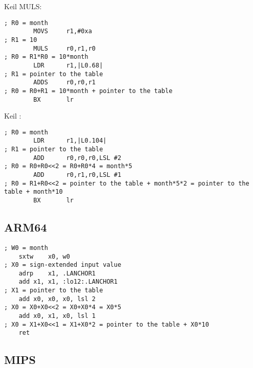 \Optimizing Keil 
 MULS:

\begin{lstlisting}[caption=\OptimizingKeilVI (\ThumbMode)]
; R0 = month
        MOVS     r1,#0xa
; R1 = 10
        MULS     r0,r1,r0
; R0 = R1*R0 = 10*month
        LDR      r1,|L0.68|
; R1 = pointer to the table
        ADDS     r0,r0,r1
; R0 = R0+R1 = 10*month + pointer to the table
        BX       lr
\end{lstlisting}

\Optimizing Keil :

\begin{lstlisting}[caption=\OptimizingKeilVI (\ARMMode)]
; R0 = month
        LDR      r1,|L0.104|
; R1 = pointer to the table
        ADD      r0,r0,r0,LSL #2
; R0 = R0+R0<<2 = R0+R0*4 = month*5
        ADD      r0,r1,r0,LSL #1
; R0 = R1+R0<<2 = pointer to the table + month*5*2 = pointer to the table + month*10
        BX       lr
\end{lstlisting}

\subsection{ARM64}

\begin{lstlisting}[caption=\Optimizing GCC 4.9 ARM64]
; W0 = month
	sxtw	x0, w0
; X0 = sign-extended input value
	adrp	x1, .LANCHOR1
	add	x1, x1, :lo12:.LANCHOR1
; X1 = pointer to the table
	add	x0, x0, x0, lsl 2
; X0 = X0+X0<<2 = X0+X0*4 = X0*5
	add	x0, x1, x0, lsl 1
; X0 = X1+X0<<1 = X1+X0*2 = pointer to the table + X0*10
	ret
\end{lstlisting}

\fi

\ifdefined\IncludeMIPS
\subsection{MIPS}

\fi

